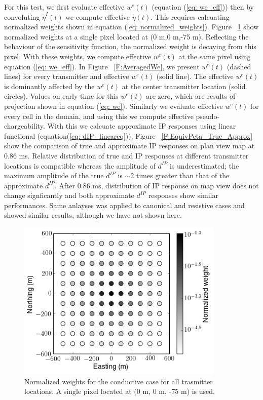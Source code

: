 \documentclass[a4paper, 11pt]{article}
\newcommand{\peta}{\tilde{\eta}}
\newcommand{\dip}{d^{IP}}
\begin{document}
For this test, we first evaluate effective $w^e(t)$ (equation (\ref{eq: we_eff})) then by convoluting $\peta^I(t)$ we compute effective $\peta(t)$. 
This requires calcuating normalized weights shown in equation (\ref{eq: normalized_weights}). 
Figure ~\ref{F:NormalizedWeights} show normalized weights at a single pixel located at (0 m,0 m,-75 m). Reflecting the behaviour of the sensitivity function, the normalized weight is decaying from this pixel. 
With these weights, we compute effective $w^e(t)$ at the same pixel using equation (\ref{eq: we_eff}). 
In Figure ~\ref{F:AveragedWe}, we present $w^e(t)$ (dashed lines) for every transmitter and effective $w^e(t)$ (solid line).
The effective $w^e(t)$ is dominantly affected by the $w^e(t)$ at the center transmitter location (solid circles). Values on early time for this $w^e(t)$ are zero, which are results of projection shown in equation (\ref{eq: we}).
Similarly we evaluate effective $w^e(t)$ for every cell in the domain, and using this we compute effective pseudo-chargeability.
With this we calcuate approximate IP responses using linear functional (equation(\ref{eq: dIP_lineareq})).
Figure ~\ref{F:EquivPeta_True_Approx} show the comparison of true and approximate IP responses on plan view map at 0.86 ms. Relative distribution of true and IP responses at different transmitter locations is compatible whereas the amplitude of $\dip$ is underestimated; the maximum amplitude of the true $\dip$ is $\sim$2 times greater than that of the approximate $\dip$. 
After 0.86 ms, distribution of IP response on map view does not change signficantly and both approximate $\dip$ responses show similar performances.
Same anlayses was applied to canonical and resistive cases and showed similar results, although we have not shown here. 

\begin{figure}[htb]
  \centering
  \includegraphics[width=1.\textwidth]{figures/NormalizedWeights.png}
  \caption{Normalized weights for the conductive case for all trasmitter locations. A single pixel located at (0 m, 0 m, -75 m) is used. }
  \label{F:NormalizedWeights}
\end{figure}
\end{document}
